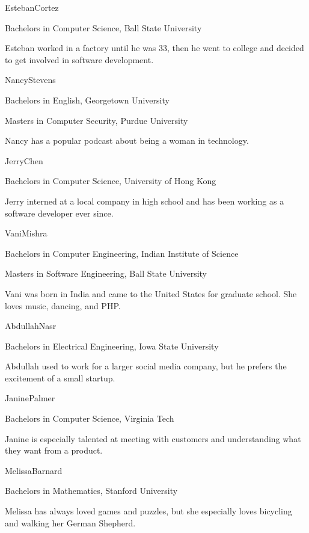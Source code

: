 \documentclass[letterpaper]{article}
\begin{document}
\begin{character}{Esteban}{Cortez}
{\item Bachelors in Computer Science, Ball State University}
Esteban worked in a factory until he was 33, then he went to college and decided to get involved in software development.
\end{character}

\begin{character}{Nancy}{Stevens}
{\item Bachelors in English, Georgetown University
 \item Masters in Computer Security, Purdue University}
Nancy has a popular podcast about being a woman in technology.
\end{character}

\begin{character}{Jerry}{Chen}
{\item Bachelors in Computer Science, University of Hong Kong}
Jerry interned at a local company in high school and has been working as a software developer ever since.
\end{character}

\begin{character}{Vani}{Mishra}
{\item Bachelors in Computer Engineering, Indian Institute of Science
 \item Masters in Software Engineering, Ball State University}
Vani was born in India and came to the United States for graduate school. She loves music, dancing, and PHP.
\end{character}

\begin{character}{Abdullah}{Nasr}
{\item Bachelors in Electrical Engineering, Iowa State University}
Abdullah used to work for a larger social media company, but he prefers the excitement of a small startup.
\end{character}

\begin{character}{Janine}{Palmer}
{\item Bachelors in Computer Science, Virginia Tech}
Janine is especially talented at meeting with customers and understanding what they want from a product.
\end{character}

\begin{character}{Melissa}{Barnard}
{\item Bachelors in Mathematics, Stanford University}
Melissa has always loved games and puzzles, but she especially loves bicycling and walking her German Shepherd.
\end{character}
\end{document}
